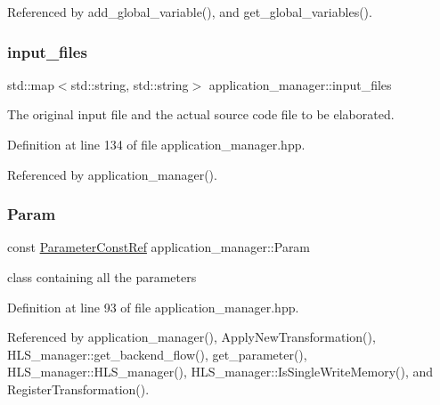 Referenced by add\+\_\+global\+\_\+variable(), and get\+\_\+global\+\_\+variables().

\mbox{\label{classapplication__manager_a8ddc0adc950ac9298402b66eadede94f}} 
\subsubsection{\texorpdfstring{input\+\_\+files}{input\_files}}
{\footnotesize\ttfamily std\+::map$<$std\+::string, std\+::string$>$ application\+\_\+manager\+::input\+\_\+files}



The original input file and the actual source code file to be elaborated. 



Definition at line 134 of file application\+\_\+manager.\+hpp.



Referenced by application\+\_\+manager().

\mbox{\label{classapplication__manager_ae975e0d3da59a3180f343fa936d72353}} 
\subsubsection{\texorpdfstring{Param}{Param}}
{\footnotesize\ttfamily const \hyperlink{Parameter_8hpp_a37841774a6fcb479b597fdf8955eb4ea}{Parameter\+Const\+Ref} application\+\_\+manager\+::\+Param\hspace{0.3cm}{\ttfamily [protected]}}



class containing all the parameters 



Definition at line 93 of file application\+\_\+manager.\+hpp.



Referenced by application\+\_\+manager(), Apply\+New\+Transformation(), H\+L\+S\+\_\+manager\+::get\+\_\+backend\+\_\+flow(), get\+\_\+parameter(), H\+L\+S\+\_\+manager\+::\+H\+L\+S\+\_\+manager(), H\+L\+S\+\_\+manager\+::\+Is\+Single\+Write\+Memory(), and Register\+Transformation().


